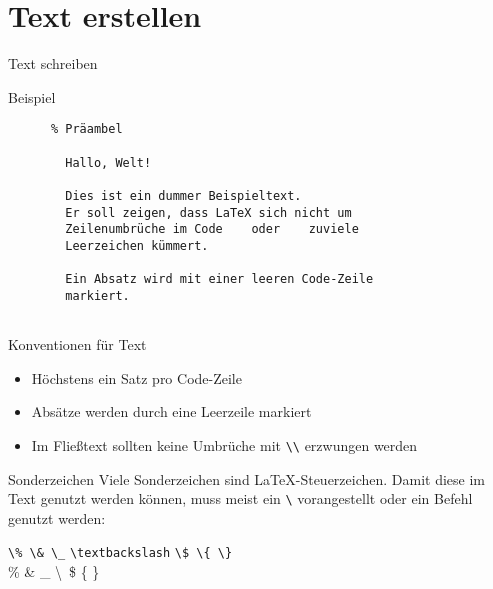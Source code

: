 \section{Text erstellen}

\begin{frame}[fragile]{Text schreiben}
  \begin{tblock}{Beispiel}
    \begin{lstlisting}
      % Präambel
      
        Hallo, Welt!

        Dies ist ein dummer Beispieltext.
        Er soll zeigen, dass LaTeX sich nicht um
        Zeilenumbrüche im Code    oder    zuviele
        Leerzeichen kümmert.

        Ein Absatz wird mit einer leeren Code-Zeile
        markiert.
      
    \end{lstlisting}
  \end{tblock}
\end{frame}

\begin{frame}[fragile]{Konventionen für Text}
  \begin{itemize}
    \item Höchstens ein Satz pro Code-Zeile
    \item Absätze werden durch eine Leerzeile markiert
    \item Im Fließtext sollten keine Umbrüche mit \verb+\\+ erzwungen werden
  \end{itemize}
  \begin{alerttblock}{Sonderzeichen}
    Viele Sonderzeichen sind \LaTeX-Steuerzeichen.
    Damit diese im Text genutzt werden können, muss meist ein \verb+\+ vorangestellt oder ein Befehl genutzt werden:
    \begin{center}
      \verb+\% \& \_+ \lstinline+\textbackslash+ \verb+\$ \{ \}+ \\
      \% \& \_ \textbackslash\ \$ \{ \}
    \end{center}
  \end{alerttblock}
\end{frame}

